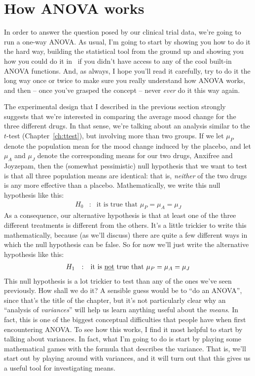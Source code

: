 \section{How ANOVA works \label{sec:anovaintro}}

In order to answer the question posed by our clinical trial data, we're going to run a one-way ANOVA. As usual, I'm going to start by showing you how to do it the hard way, building the statistical tool from the ground up and showing you how you could do it in \R\ if you didn't have access to any of the cool built-in ANOVA functions. And, as always, I hope you'll read it carefully, try to do it the long way once or twice to make sure you really understand how ANOVA works, and then -- once you've grasped the concept -- never {\it ever} do it this way again.

The experimental design that I described in the previous section strongly suggests that we're interested in comparing the average mood change for the three different drugs. In that sense, we're talking about an analysis similar to the $t$-test (Chapter~\ref{ch:ttest}), but involving more than two groups. If we let $\mu_P$ denote the population mean for the mood change induced by the placebo, and let $\mu_A$ and $\mu_J$ denote the corresponding means for our two drugs, Anxifree and Joyzepam, then the (somewhat pessimistic) null hypothesis that we want to test is that all three population means are identical: that is, {\it neither} of the two drugs is any more effective than a placebo. Mathematically, we write this null hypothesis like this:
$$
\begin{array}{rcl}
H_0 &:& \mbox{it is true that } \mu_P = \mu_A = \mu_J
\end{array}
$$
As a consequence, our alternative hypothesis is that at least one of the three different treatments is different from the others. It's a little trickier to write this mathematically, because (as we'll discuss) there are quite a few different ways in which the null hypothesis can be false. So for now we'll just write the alternative hypothesis like this:
$$
\begin{array}{rcl}
H_1 &:& \mbox{it is \underline{not} true that } \mu_P = \mu_A = \mu_J
\end{array}
$$
This null hypothesis is a lot trickier to test than any of the ones we've seen previously. How shall we do it? A sensible guess would be to ``do an ANOVA'', since that's the title of the chapter, but it's not particularly clear why an ``analysis of {\it variances}'' will help us learn anything useful about the {\it means}. In fact, this is one of the biggest conceptual difficulties that people have when first encountering ANOVA. To see how this works, I find it most helpful to start by talking about variances. In fact, what I'm going to do is start by playing some mathematical games with the formula that describes the variance. That is, we'll start out by playing around with variances, and it will turn out that this gives us a useful tool for investigating means.



